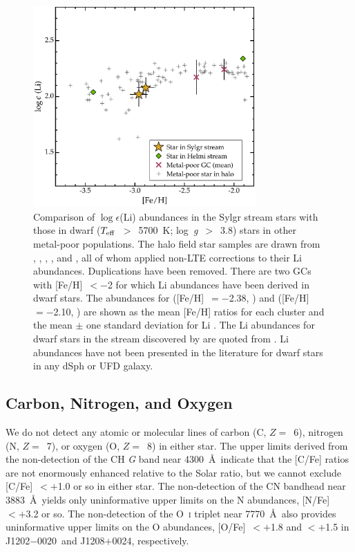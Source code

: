 \documentclass[twocolumn,tighten]{aastex62}
\newcommand{\jtwo}{J1202$-$0020}
\newcommand{\jeight}{J1208$+$0024}
\newcommand{\logg}{\mbox{log~{\it g}}}
\newcommand{\teff}{\mbox{$T_{\rm eff}$}}
\begin{document}
\begin{figure}
\includegraphics[angle=0,width=3.35in]{fig2.pdf}
\caption{
\label{lifeplot}
Comparison of $\log\epsilon$(Li) abundances in the
Sylgr stream stars with those in dwarf
(\teff~$>$~5700~K; \logg~$>$~3.8) 
stars in other metal-poor populations.
The halo field star samples are drawn from
\citet{boesgaard05},
\citet{asplund06},
\citet{bonifacio07,bonifacio12},
\citet{melendez10}, 
and
\citet{sbordone10},
all of whom applied non-LTE corrections to their Li abundances.
Duplications have been removed.
There are two GCs with [Fe/H]~$< -$2
for which Li abundances have been derived in dwarf stars.
The abundances for 
([Fe/H]~$= -$2.38, \citealt{cohen11n2419})
and
([Fe/H]~$= -$2.10, \citealt{koch11})
are shown as the mean [Fe/H] ratios for each cluster
and the mean $\pm$ one standard deviation for Li
\citep{lind09n6397,gruyters16}.
The Li abundances for dwarf
stars in the stream discovered by \citet{helmi99}
are quoted from \citet{roederer14c}.
Li abundances have not been presented in the literature for
dwarf stars in any dSph or UFD galaxy.
 }
\end{figure}


\subsection{Carbon, Nitrogen, and Oxygen}
\label{cno}


We do not detect any atomic or molecular lines of 
carbon (C, $Z =$~6), 
nitrogen (N, $Z =$~7), or
oxygen (O, $Z =$~8) in either star.
The upper limits derived from the non-detection of the
CH \textit{G} band near 4300~\AA\ indicate that the
[C/Fe] ratios are not enormously enhanced relative 
to the Solar ratio, but we cannot exclude 
[C/Fe]~$< +$1.0 or so in either star.
The non-detection of the CN bandhead near 3883~\AA\
yields only uninformative upper limits on the N abundances,
[N/Fe]~$< +$3.2 or so.
The non-detection of the O~\textsc{i} triplet near
7770~\AA\ also provides uninformative upper limits on the O abundances,
[O/Fe]~$< +$1.8 and $< +$1.5 in \jtwo\ and \jeight, respectively.
\end{document}
